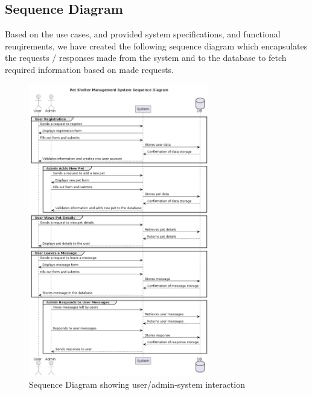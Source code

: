 \subsection{Sequence Diagram}
Based on the use cases, and provided system specifications, and functional reuqirements, we have created the following sequence diagram which encapsulates the requests / responses made from the system and to the database to fetch required information based on made requests.
\begin{figure}[H]
    \centering
    \includegraphics[width=0.7\textwidth]{images/seqDiagram.png}
    \caption{Sequence Diagram showing user/admin-system interaction}
\end{figure}


